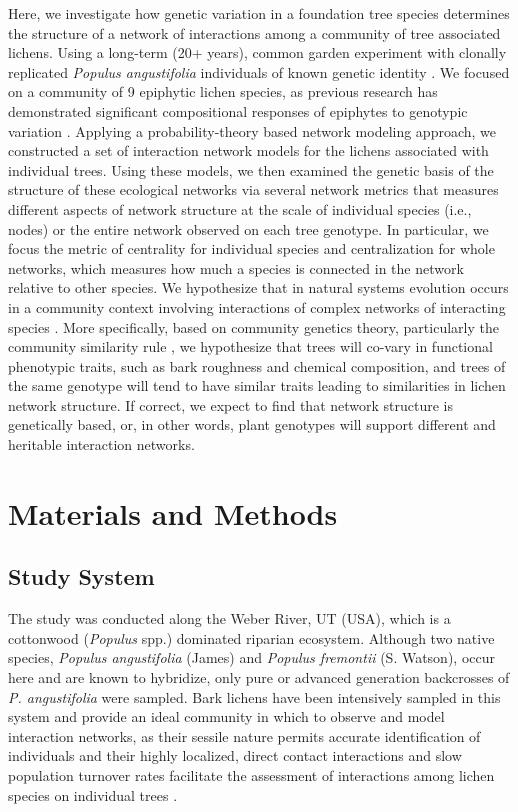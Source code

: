 \documentclass[fleqn,12pt]{olplainarticle}
\begin{document}
Here, we investigate how genetic variation in a foundation tree
species determines the structure of a network of interactions among a
community of tree associated lichens.  Using a long-term (20+ years),
common garden experiment with clonally replicated \textit{Populus
  angustifolia} individuals of known genetic identity
\cite{Martinsen2001HybridSpecies}. We focused on a community of 9
epiphytic lichen species, as previous research has demonstrated
significant compositional responses of epiphytes to genotypic
variation \citep{Winfree2011, Zytynska2011}. Applying a
probability-theory based network modeling approach, we constructed a
set of interaction network models for the lichens associated with
individual trees. Using these models, we then examined the genetic
basis of the structure of these ecological networks via several
network metrics that measures different aspects of network structure
at the scale of individual species (i.e., nodes) or the entire network
observed on each tree genotype. In particular, we focus the metric of
centrality for individual species and centralization for whole
networks, which measures how much a species is connected in the
network relative to other species. We hypothesize that in natural
systems evolution occurs in a community context involving interactions
of complex networks of interacting species \cite{Lau2015a, Keith2017,
  Thompson2013, Bascompte2006}. More specifically, based on community
genetics theory, particularly the community similarity rule
\citep{Bangert2006}, we hypothesize that trees will co-vary in
functional phenotypic traits, such as bark roughness and chemical
composition, and trees of the same genotype will tend to have similar
traits leading to similarities in lichen network structure. If
correct, we expect to find that network structure is genetically
based, or, in other words, plant genotypes will support different and
heritable interaction networks. 


\section*{Materials and Methods}


\subsection*{Study System}

The study was conducted along the Weber River, UT (USA), which is a
cottonwood (\textit{Populus} spp.) dominated riparian
ecosystem. Although two native species, \textit{Populus angustifolia}
(James) and \textit{Populus fremontii} (S. Watson), occur here and are
known to hybridize, only pure or advanced generation backcrosses of
\textit{P. angustifolia} were sampled. Bark lichens have been
intensively sampled in this system and provide an ideal community in
which to observe and model interaction networks, as their sessile
nature permits accurate identification of individuals and their highly
localized, direct contact interactions and slow population turnover
rates facilitate the assessment of interactions among lichen species
on individual trees \cite{Lamit2011}.
\end{document}
